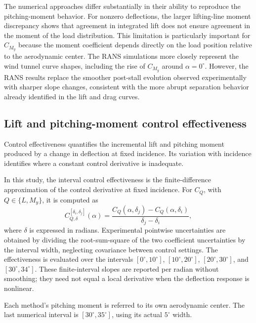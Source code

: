 \documentclass[journal ]{new-aiaa}
\begin{document}
The numerical approaches differ substantially in their ability to reproduce the pitching-moment behavior.
For nonzero deflections, the larger lifting-line moment discrepancy shows that agreement in integrated lift does not ensure agreement in the moment of the load distribution.
This limitation is particularly important for $C_{M_y}$ because the moment coefficient depends directly on the load position relative to the aerodynamic center.
The RANS simulations more closely represent the wind tunnel curve shapes, including the rise of $C_{M_y}$ around $\alpha=0^\circ$.
However, the RANS results replace the smoother post-stall evolution observed experimentally with sharper slope changes, consistent with the more abrupt separation behavior already identified in the lift and drag curves.



\subsection{Lift and pitching-moment control effectiveness}
\label{sec:effectiveness_results}


Control effectiveness quantifies the incremental lift and pitching moment produced by a change in deflection at fixed incidence. Its variation with incidence identifies where a constant control derivative is inadequate.

In this study, the interval control effectiveness is the finite-difference approximation of the control derivative at fixed incidence. For \(C_Q\), with \(Q\in\{L,M_y\}\), it is computed as
\begin{equation}
C_{Q,\delta}^{[\delta_i,\delta_j]}(\alpha)
=
\frac{
C_Q(\alpha,\delta_j)-C_Q(\alpha,\delta_i)
}{
\delta_j-\delta_i
},
\label{eq:control_effectiveness_interval}
\end{equation}
where \(\delta\) is expressed in radians. Experimental pointwise uncertainties are obtained by dividing the root-sum-square of the two coefficient uncertainties by the interval width, neglecting covariance between control settings.
The effectiveness is evaluated over the intervals \([0^\circ,10^\circ]\), \([10^\circ,20^\circ]\), \([20^\circ,30^\circ]\), and \([30^\circ,34^\circ]\).
These finite-interval slopes are reported per radian without smoothing; they need not equal a local derivative when the deflection response is nonlinear.

Each method's pitching moment is referred to its own aerodynamic center.
The last numerical interval is \([30^\circ,35^\circ]\), using its actual \(5^\circ\) width.
\end{document}
